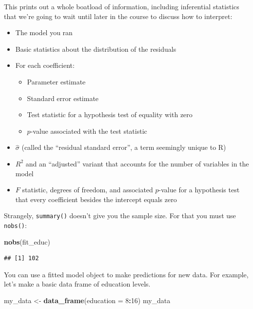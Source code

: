 \documentclass[
  12pt,
  oneside,openany]{book}
\newenvironment{Shaded}{\begin{snugshade}}{\end{snugshade}}
\newcommand{\DataTypeTok}[1]{\textcolor[rgb]{0.13,0.29,0.53}{#1}}
\newcommand{\DecValTok}[1]{\textcolor[rgb]{0.00,0.00,0.81}{#1}}
\newcommand{\KeywordTok}[1]{\textcolor[rgb]{0.13,0.29,0.53}{\textbf{#1}}}
\newcommand{\NormalTok}[1]{#1}
\newcommand{\OperatorTok}[1]{\textcolor[rgb]{0.81,0.36,0.00}{\textbf{#1}}}
\newcommand{\StringTok}[1]{\textcolor[rgb]{0.31,0.60,0.02}{#1}}
\providecommand{\tightlist}{%
  \setlength{\itemsep}{0pt}\setlength{\parskip}{0pt}}
\begin{document}
This prints out a whole boatload of information, including inferential statistics that we're going to wait until later in the course to discuss how to interpret:

\begin{itemize}
\tightlist
\item
  The model you ran
\item
  Basic statistics about the distribution of the residuals
\item
  For each coefficient:

  \begin{itemize}
  \tightlist
  \item
    Parameter estimate
  \item
    Standard error estimate
  \item
    Test statistic for a hypothesis test of equality with zero
  \item
    \(p\)-value associated with the test statistic
  \end{itemize}
\item
  \(\hat{\sigma}\) (called the ``residual standard error'', a term seemingly unique to R)
\item
  \(R^2\) and an ``adjusted'' variant that accounts for the number of variables in the model
\item
  \(F\) statistic, degrees of freedom, and associated \(p\)-value for a hypothesis test that every coefficient besides the intercept equals zero
\end{itemize}

Strangely, \texttt{summary()} doesn't give you the sample size. For that you must use \texttt{nobs()}:

\begin{Shaded}
\begin{Highlighting}[]
\KeywordTok{nobs}\NormalTok{(fit\_educ)}
\end{Highlighting}
\end{Shaded}

\begin{verbatim}
## [1] 102
\end{verbatim}

You can use a fitted model object to make predictions for new data. For example, let's make a basic data frame of education levels.

\begin{Shaded}
\begin{Highlighting}[]
\NormalTok{my\_data \textless{}{-}}\StringTok{ }\KeywordTok{data\_frame}\NormalTok{(}\DataTypeTok{education =} \DecValTok{8}\OperatorTok{:}\DecValTok{16}\NormalTok{)}
\NormalTok{my\_data}
\end{Highlighting}
\end{Shaded}
\end{document}
